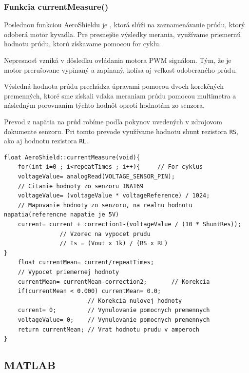 	
\subsubsection{Funkcia currentMeasure()}	
	
Poslednou funkciou AeroShieldu je , ktorá slúži na zaznamenávanie prúdu, ktorý odoberá motor kyvadla. Pre presnejšie výsledky merania, využívame priemernú hodnotu prúdu, ktorú získavame pomocou for cyklu. 

Nepresnosť vzniká v dôsledku ovládania motora PWM signálom. Tým, že je motor prerušovane vypínaný a zapínaný, kolísa aj veľkosť odoberaného prúdu. 

Výsledná hodnota prúdu prechádza úpravami pomocou dvoch korekčných premenných, ktoré sme získali vďaka meraniam prúdu pomocou multimetra a následným porovnaním týchto hodnôt oproti hodnotám zo senzora. 

Prevod z napätia na prúd robíme podľa pokynov uvedených v zdrojovom dokumente senzoru. Pri tomto prevode využívame hodnotu shunt rezistora \verb|RS|, ako aj hodnotu rezistora \verb|RL|. 
  
	
\begin{lstlisting}[caption={Zdrojový kód funkcie currentMeasure.},captionpos=b]	
float AeroShield::currentMeasure(void){  
	for(int i=0 ; i<repeatTimes ; i++){     // For cyklus
	voltageValue= analogRead(VOLTAGE_SENSOR_PIN);     
	// Citanie hodnoty zo senzoru INA169 
	voltageValue= (voltageValue * voltageReference) / 1024;    
	// Mapovanie hodnoty zo senzoru, na realnu hodnotu napatia(referencne napatie je 5V)
	current= current + correction1-(voltageValue / (10 * ShuntRes));    
                // Vzorec na vypocet prudu
                // Is = (Vout x 1k) / (RS x RL)
}                                                                         	
	float currentMean= current/repeatTimes;   
	// Vypocet priemernej hodnoty  
	currentMean= currentMean-correction2;       // Korekcia
	if(currentMean < 0.000) currentMean= 0.0;                 
	                    // Korekcia nulovej hodnoty
	current= 0;         // Vynulovanie pomocnych premennych   
	voltageValue= 0;    // Vynulovanie pomocnych premennych   
	return currentMean; // Vrat hodnotu prudu v amperoch
}
\end{lstlisting}
	
\subsection{MATLAB}	
\label{matlabik}
	
